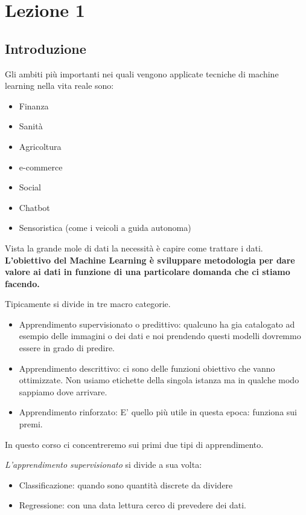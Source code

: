 \section{Lezione 1}

\subsection{Introduzione}
Gli ambiti più importanti nei quali vengono applicate tecniche di machine learning nella vita reale sono:
\begin{itemize}
	\item Finanza
	\item Sanità
	\item Agricoltura
	\item e-commerce
	\item Social
	\item Chatbot
	\item Sensoristica (come i veicoli a guida autonoma)
\end{itemize}

Vista la grande mole di dati la necessità è capire come trattare i dati.
\textbf{L'obiettivo del Machine Learning è sviluppare metodologia per dare valore ai dati in funzione di una particolare domanda che ci stiamo facendo.}

Tipicamente si divide in tre macro categorie.
\begin{itemize}
	\item Apprendimento supervisionato o predittivo: qualcuno ha gia catalogato ad esempio delle immagini o dei dati e noi prendendo questi modelli dovremmo essere in grado di predire.
	\item Apprendimento descrittivo: ci sono delle funzioni obiettivo che vanno ottimizzate. Non usiamo etichette della singola istanza ma in qualche modo sappiamo dove arrivare.
	\item Apprendimento rinforzato: E' quello più utile in questa epoca: funziona sui premi.
\end{itemize}

In questo corso ci concentreremo sui primi due tipi di apprendimento.

\textit{L'apprendimento supervisionato} si divide a sua volta:
\begin{itemize}
	\item Classificazione: quando sono quantità discrete da dividere
	\item Regressione: con una data lettura cerco di prevedere dei dati.
\end{itemize}

